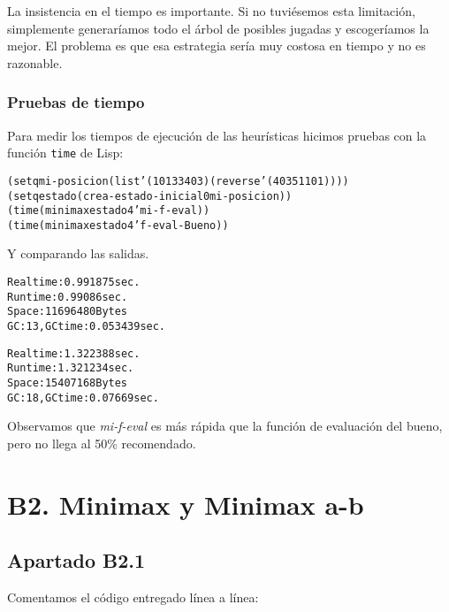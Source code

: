 \documentclass{apuntes}
\begin{document}
La insistencia en el tiempo es importante. Si no tuviésemos esta limitación, simplemente generaríamos todo el árbol de posibles jugadas y escogeríamos la mejor. El problema es que esa estrategia sería muy costosa en tiempo y no es razonable.

\subsubsection*{Pruebas de tiempo}
Para medir los tiempos de ejecución de las heurísticas hicimos pruebas con la función \texttt{time} de Lisp:

\begin{alltt}
(setq mi-posicion (list '(1 0 1 3 3 4 0 3) (reverse '(4 0 3 5 1 1 0 1))))
(setq estado (crea-estado-inicial 0 mi-posicion))
(time (minimax estado 4 'mi-f-eval))
(time (minimax estado 4 'f-eval-Bueno))
\end{alltt}

Y comparando las salidas.

\begin{alltt}
Real time: 0.991875 sec.
Run time: 0.99086 sec.
Space: 11696480 Bytes
GC: 13, GC time: 0.053439 sec.

Real time: 1.322388 sec.
Run time: 1.321234 sec.
Space: 15407168 Bytes
GC: 18, GC time: 0.07669 sec.
\end{alltt}

Observamos que \textit{mi-f-eval} es más rápida que la función de evaluación del bueno, pero no llega al 50\% recomendado.

\section*{B2. Minimax y Minimax a-b}
\subsection*{Apartado B2.1}

Comentamos el código entregado línea a línea:
\end{document}
